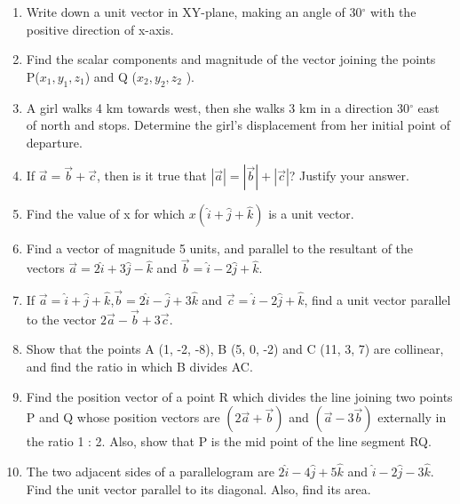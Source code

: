 \begin{enumerate}[label=\thesection.\arabic*,ref=\thesection.\theenumi]
\item Write down a unit vector in XY-plane, making an angle of 30$^{\circ}$ with the positive direction of x-axis.\\
\item Find the scalar components and magnitude of the vector joining the points P($x_1,y_1,z_1 $) and Q ($x_2,y_2,z_2$ ).\\
\item A girl walks 4 km towards west, then she walks 3 km in a direction 30$^{\circ}$ east of north and stops. Determine the girl's displacement from her initial point of departure.\\
	\solution
		
\item If $\vec{a}=\vec{b}+\vec{c}$, then is it true that $|\vec{a}|=|\vec{b}|+|\vec{c}|$? Justify your answer.\\
	\solution
		
\item Find the value of x for which $x(\hat{i}+\hat{j}+\hat{k})$ is a unit vector.\\
\item Find a vector of magnitude 5 units, and parallel to the resultant of the vectors $\vec{a}=2\hat{i}+3\hat{j}-\hat{k}$ and $\vec{b}=\hat{i}-2\hat{j}+\hat{k}$.\\
\item If $\vec{a}=\hat{i}+\hat{j}+\hat{k}$,$\vec{b}=2\hat{i}-\hat{j}+3\hat{k}$ and $\vec{c}=\hat{i}-2\hat{j}+\hat{k}$, find a unit vector parallel to the vector $2\vec{a}-\vec{b}+3\vec{c}$.\\
	\solution
		
\item Show that the points A (1, -2, -8), B (5, 0, -2) and C (11, 3, 7) are collinear, and find the ratio in which B divides AC.\\
\item Find the position vector of a point R which divides the line joining two points P and Q whose position vectors are $(2\vec{a}+\vec{b})$ and $(\vec{a}-3\vec{b})$
externally in the ratio 1 : 2. Also, show that P is the mid point of the line segment RQ.\\
\item The two adjacent sides of a parallelogram are 
$2\hat{i}-4\hat{j}+5\hat{k}$  and  $\hat{i}-2\hat{j}-3\hat{k}$.
Find the unit vector parallel to its diagonal. Also, find its area.\\

\end{enumerate}
